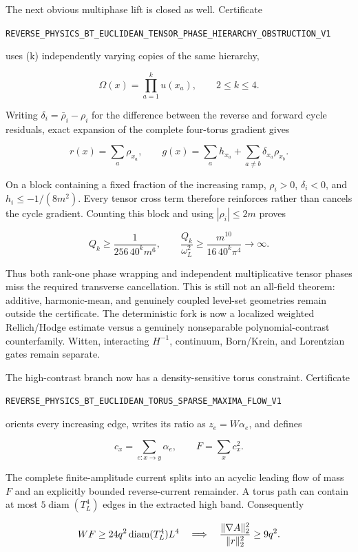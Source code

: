 \documentclass[11pt]{article}
\theoremstyle{definition}
\theoremstyle{remark}
\newcommand{\cert}[1]{\nolinkurl{#1}}
\begin{document}
The next obvious multiphase lift is closed as well.  Certificate

\cert{REVERSE_PHYSICS_BT_EUCLIDEAN_TENSOR_PHASE_HIERARCHY_OBSTRUCTION_V1}

uses (k) independently varying copies of the same hierarchy,

\[
             \Omega(x)=\prod_{a=1}^k u(x_a),\qquad2\leq k\leq4.
\]

Writing \(\delta_i=\bar\rho_i-\rho_i\) for the difference between the
reverse and forward cycle residuals, exact expansion of the complete
four-torus gradient gives

\[
 r(x)=\sum_a\rho_{x_a},\qquad
 g(x)=\sum_a h_{x_a}+\sum_{a\ne b}\delta_{x_a}\rho_{x_b}.
\]

On a block containing a fixed fraction of the increasing ramp,
\(\rho_i>0\), \(\delta_i<0\), and \(h_i\leq-1/(8m^2)\).  Every tensor
cross term therefore reinforces rather than cancels the cycle gradient.
Counting this block and using \(|\rho_i|\leq2m\) proves

\[
 Q_k\geq\frac1{256\,40^k m^6},\qquad
 \frac{Q_k}{\omega_L^2}
 \geq\frac{m^{10}}{16\,40^k\pi^4}\longrightarrow\infty.
\]

Thus both rank-one phase wrapping and independent multiplicative tensor
phases miss the required transverse cancellation.  This is still not an
all-field theorem: additive, harmonic-mean, and genuinely coupled level-set
geometries remain outside the certificate.  The deterministic fork is now a
localized weighted Rellich/Hodge estimate versus a genuinely nonseparable
polynomial-contrast counterfamily.  Witten, interacting \(H^{-1}\),
continuum, Born/Krein, and Lorentzian gates remain separate.

The high-contrast branch now has a density-sensitive torus constraint.
Certificate

\cert{REVERSE_PHYSICS_BT_EUCLIDEAN_TORUS_SPARSE_MAXIMA_FLOW_V1}

orients every increasing edge, writes its ratio as \(z_e=W\alpha_e\),
and defines

\[
 c_x=\sum_{e:x\to y}\alpha_e,
 \qquad F=\sum_xc_x^2.
\]

The complete finite-amplitude current splits into an acyclic leading flow
of mass \(F\) and an explicitly bounded reverse-current remainder.  A
torus path can contain at most \(5\operatorname{diam}(T_L^4)\) edges in
the extracted high band.  Consequently

\[
 WF\geq24q^2\operatorname{diam}(T_L^4)L^4
 \quad\Longrightarrow\quad
 {\|\nabla A\|_2^2\over\|r\|_2^2}\geq9q^2.
\]
\end{document}
